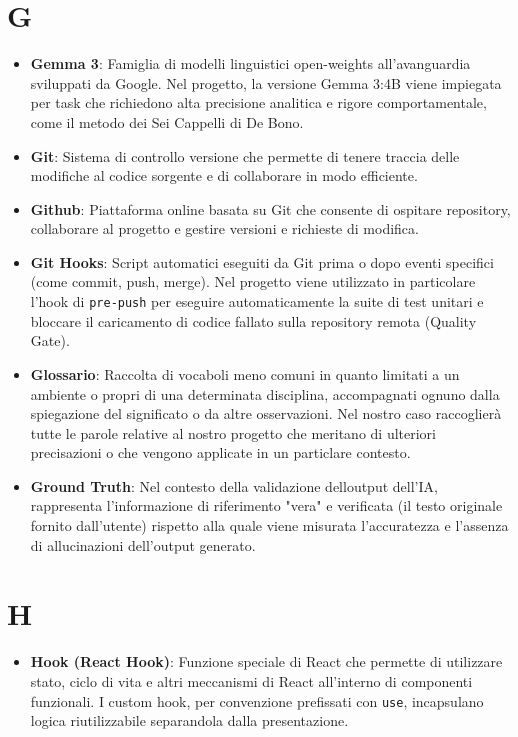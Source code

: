 \documentclass[11pt,a4paper]{article}
\begin{document}
\section*{G}
\begin{itemize}
\item \textbf{Gemma 3}: Famiglia di modelli linguistici open-weights all'avanguardia sviluppati da Google. Nel progetto, la versione Gemma 3:4B viene impiegata per task che richiedono alta precisione analitica e rigore comportamentale, come il metodo dei Sei Cappelli di De Bono.

\item \textbf{Git}: Sistema di controllo versione che permette di tenere traccia delle modifiche al codice sorgente e di collaborare in modo efficiente.

\item \textbf{Github}: Piattaforma online basata su Git che consente di ospitare repository, collaborare al progetto e gestire versioni e richieste di modifica.

\item \textbf{Git Hooks}: Script automatici eseguiti da Git prima o dopo eventi specifici (come commit, push, merge). Nel progetto viene utilizzato in particolare l'hook di \texttt{pre-push} per eseguire automaticamente la suite di test unitari e bloccare il caricamento di codice fallato sulla repository remota (Quality Gate).

\item \textbf{Glossario}: Raccolta di vocaboli meno comuni in quanto limitati a un ambiente o propri di una determinata disciplina, accompagnati ognuno dalla spiegazione del significato o da altre osservazioni. Nel nostro caso raccoglierà tutte le parole relative al nostro progetto che meritano di ulteriori precisazioni o che vengono applicate in un particlare contesto.

\item \textbf{Ground Truth}: Nel contesto della validazione delloutput dell'IA, rappresenta l'informazione di riferimento "vera" e verificata (il testo originale fornito dall'utente) rispetto alla quale viene misurata l'accuratezza e l'assenza di allucinazioni dell'output generato.
\end{itemize}
\newpage

\section*{H}
\begin{itemize}
\item \textbf{Hook (React Hook)}: Funzione speciale di React che 
permette di utilizzare stato, ciclo di vita e altri meccanismi 
di React all'interno di componenti funzionali. I custom hook, 
per convenzione prefissati con \texttt{use}, incapsulano logica 
riutilizzabile separandola dalla presentazione.
\end{itemize}
\newpage
\end{document}
